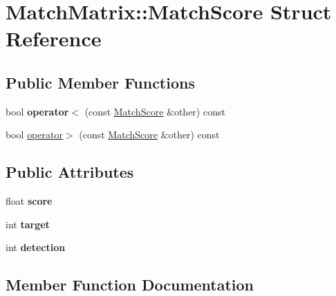 \hypertarget{structMatchMatrix_1_1MatchScore}{}\section{Match\+Matrix\+:\+:Match\+Score Struct Reference}
\label{structMatchMatrix_1_1MatchScore}
\subsection*{Public Member Functions}
\begin{DoxyCompactItemize}
\item 
\hypertarget{structMatchMatrix_1_1MatchScore_a513da9be2dd33623cf10ee89cb8c07b6}{}bool {\bfseries operator$<$} (const \hyperlink{structMatchMatrix_1_1MatchScore}{Match\+Score} \&other) const \label{structMatchMatrix_1_1MatchScore_a513da9be2dd33623cf10ee89cb8c07b6}

\item 
bool \hyperlink{structMatchMatrix_1_1MatchScore_a421a9d1378477bc3eca2d21be3727f29}{operator$>$} (const \hyperlink{structMatchMatrix_1_1MatchScore}{Match\+Score} \&other) const 
\end{DoxyCompactItemize}
\subsection*{Public Attributes}
\begin{DoxyCompactItemize}
\item 
\hypertarget{structMatchMatrix_1_1MatchScore_ae010c355f78da1c87414ac39ffe78c17}{}float {\bfseries score}\label{structMatchMatrix_1_1MatchScore_ae010c355f78da1c87414ac39ffe78c17}

\item 
\hypertarget{structMatchMatrix_1_1MatchScore_a5c45c25ef66cd4652cf471bccb04c68b}{}int {\bfseries target}\label{structMatchMatrix_1_1MatchScore_a5c45c25ef66cd4652cf471bccb04c68b}

\item 
\hypertarget{structMatchMatrix_1_1MatchScore_a09cf9c584222c9373117dacba658f608}{}int {\bfseries detection}\label{structMatchMatrix_1_1MatchScore_a09cf9c584222c9373117dacba658f608}

\end{DoxyCompactItemize}


\subsection{Member Function Documentation}
\hypertarget{structMatchMatrix_1_1MatchScore_a421a9d1378477bc3eca2d21be3727f29}{}
